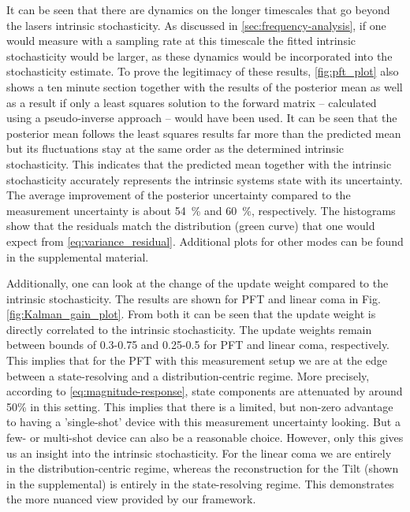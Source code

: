 \documentclass[9pt, twocolumn,superscriptaddress]{revtex4}
\begin{document}
It can be seen that there are dynamics on the longer timescales that go beyond the lasers intrinsic stochasticity. As discussed in \cref{sec:frequency-analysis}, if one would measure with a sampling rate at this timescale the fitted intrinsic stochasticity would be larger, as these dynamics would be incorporated into the stochasticity estimate.
To prove the legitimacy of these results, \cref{fig:pft_plot} also shows a ten minute section together with the results of the posterior mean as well as a result if only a least squares solution to the forward matrix -- calculated using a pseudo-inverse approach -- would have been used. It can be seen that the posterior mean follows the least squares results far more than the predicted mean but its fluctuations stay at the same order as the determined intrinsic stochasticity. This indicates that the predicted mean together with the intrinsic stochasticity accurately represents the intrinsic systems state with its uncertainty. The average improvement of the posterior uncertainty compared to the measurement uncertainty is about \SI{54}{\%} and \SI{60}{\%}, respectively. The histograms show that the residuals match the distribution (green curve) that one would expect from \cref{eq:variance_residual}. Additional plots for other modes can be found in the supplemental material.

Additionally, one can look at the change of the update weight compared to the intrinsic stochasticity. The results are shown for PFT and linear coma in Fig. \ref{fig:Kalman_gain_plot}. From both it can be seen that the update weight is directly correlated to the intrinsic stochasticity. The update weights remain between bounds of 0.3-0.75 and 0.25-0.5 for PFT and linear coma, respectively. This implies that for the PFT with this measurement setup we are at the edge between a state-resolving and a distribution-centric regime. More precisely, according to \cref{eq:magnitude-response}, state components are attenuated by around 50\% in this setting. This implies that there is a limited, but non-zero advantage to having a 'single-shot' device with this measurement uncertainty looking. But a few- or multi-shot device can also be a reasonable choice. However, only this gives us an insight into the intrinsic stochasticity. For the linear coma we are entirely in the distribution-centric regime, whereas the reconstruction for the Tilt (shown in the supplemental) is entirely in the state-resolving regime. This demonstrates the more nuanced view provided by our framework.
\end{document}
